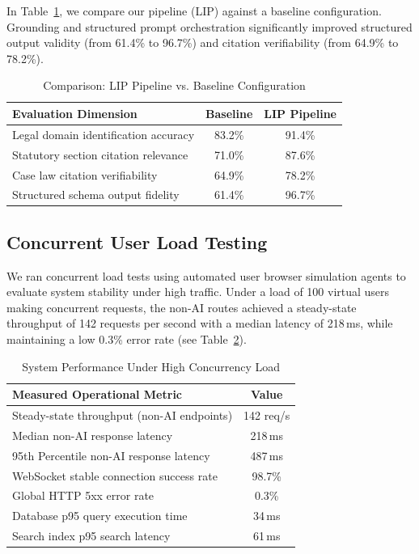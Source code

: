 \documentclass[conference]{IEEEtran}
\begin{document}
In Table~\ref{tab:compare}, we compare our pipeline (LIP) against a baseline configuration. Grounding and structured prompt orchestration significantly improved structured output validity (from 61.4\% to 96.7\%) and citation verifiability (from 64.9\% to 78.2\%).

\begin{table}[!t]
\centering
\renewcommand{\arraystretch}{1.3}
\caption{Comparison: LIP Pipeline vs. Baseline Configuration}
\label{tab:compare}
\begin{tabularx}{\columnwidth}{@{} X c c @{}}
\toprule
\textbf{Evaluation Dimension} & \textbf{Baseline} & \textbf{LIP Pipeline} \\
\midrule
Legal domain identification accuracy & 83.2\% & 91.4\% \\
Statutory section citation relevance  & 71.0\% & 87.6\% \\
Case law citation verifiability       & 64.9\% & 78.2\% \\
Structured schema output fidelity      & 61.4\% & 96.7\% \\
\bottomrule
\end{tabularx}
\end{table}

\subsection{Concurrent User Load Testing}
We ran concurrent load tests using automated user browser simulation agents to evaluate system stability under high traffic. Under a load of 100 virtual users making concurrent requests, the non-AI routes achieved a steady-state throughput of 142 requests per second with a median latency of 218\,ms, while maintaining a low 0.3\% error rate (see Table~\ref{tab:load}).

\begin{table}[!t]
\centering
\renewcommand{\arraystretch}{1.3}
\caption{System Performance Under High Concurrency Load}
\label{tab:load}
\begin{tabularx}{\columnwidth}{@{} X c @{}}
\toprule
\textbf{Measured Operational Metric} & \textbf{Value} \\
\midrule
Steady-state throughput (non-AI endpoints) & 142 req/s \\
Median non-AI response latency & 218\,ms \\
95th Percentile non-AI response latency & 487\,ms \\
WebSocket stable connection success rate & 98.7\% \\
Global HTTP 5xx error rate & 0.3\% \\
Database p95 query execution time & 34\,ms \\
Search index p95 search latency & 61\,ms \\
\bottomrule
\end{tabularx}
\end{table}
\end{document}
